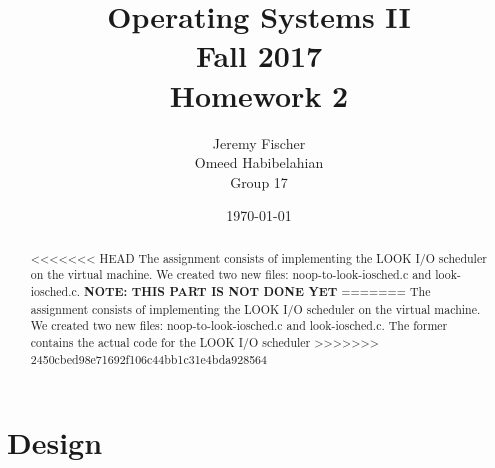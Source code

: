 \documentclass[draftclsnofoot, onecolumn, 10pt, compsoc]{IEEEtran}
\title{\textbf{Operating Systems II}\\Fall 2017\\Homework 2}
\author{Jeremy Fischer\\Omeed Habibelahian\\Group 17}
\date{\today}
\begin{document}
	\maketitle
	\begin{abstract}
<<<<<<< HEAD
		The assignment consists of implementing the LOOK I/O scheduler on the virtual machine. We created two new files: noop-to-look-iosched.c and look-iosched.c. \textbf{NOTE: THIS PART IS NOT DONE YET}
=======
		The assignment consists of implementing the LOOK I/O scheduler on the virtual machine. We created two new files: noop-to-look-iosched.c and look-iosched.c. The former contains the actual code for the LOOK I/O scheduler
>>>>>>> 2450cbed98e71692f106c44bb1c31e4bda928564
	\end{abstract}
	\newpage
	
	\section{Design}
	
\end{document}
